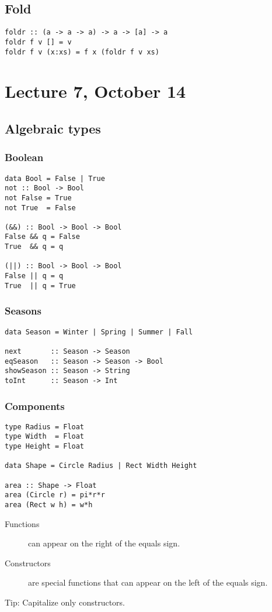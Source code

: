 \documentclass{article}
\begin{document}
\subsection{Fold}
\begin{verbatim}
foldr :: (a -> a -> a) -> a -> [a] -> a
foldr f v [] = v
foldr f v (x:xs) = f x (foldr f v xs)
\end{verbatim}
\section{Lecture 7, October 14}
\subsection{Algebraic types}
\subsubsection{Boolean}
\begin{verbatim}
data Bool = False | True
not :: Bool -> Bool
not False = True
not True  = False

(&&) :: Bool -> Bool -> Bool
False && q = False
True  && q = q

(||) :: Bool -> Bool -> Bool
False || q = q
True  || q = True
\end{verbatim}
\subsubsection{Seasons}
\begin{verbatim}
data Season = Winter | Spring | Summer | Fall

next       :: Season -> Season
eqSeason   :: Season -> Season -> Bool
showSeason :: Season -> String
toInt      :: Season -> Int
\end{verbatim}
\subsubsection{Components}
\begin{verbatim}
type Radius = Float
type Width  = Float
type Height = Float

data Shape = Circle Radius | Rect Width Height

area :: Shape -> Float
area (Circle r) = pi*r*r
area (Rect w h) = w*h
\end{verbatim}
\begin{description}
	\item[Functions] can appear on the right of the equals sign.
	\item[Constructors] are special functions that can appear on the left of the equals sign.
\end{description}
Tip: Capitalize only constructors.
\end{document}
